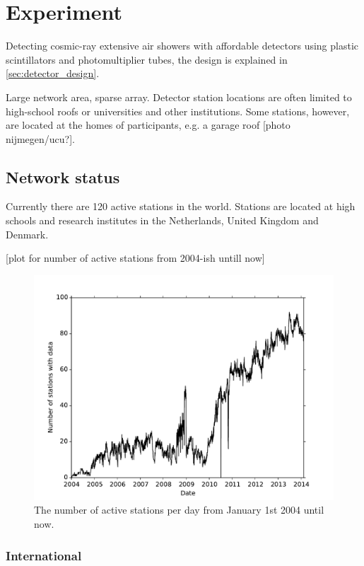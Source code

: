 \chapter{\hisparc Experiment}
\label{ch:hisparc-experiment}

Detecting cosmic-ray extensive air showers with affordable detectors
using plastic scintillators and photomultiplier tubes, the design is
explained in \cref{sec:detector_design}.

Large network area, sparse array. Detector station locations are often
limited to high-school roofs or universities and other institutions.
Some stations, however, are located at the homes of participants, e.g.
a garage roof [photo nijmegen/ucu?].


\section{Network status}

Currently there are 120 active \hisparc stations in the world. Stations
are located at high schools and research institutes in the Netherlands,
United Kingdom and Denmark.

[plot for number of active stations from 2004-ish untill now]

\begin{figure}
    \centering
    \includegraphics[width=0.7\linewidth]
        {plots/network/number_of_stations_with_data_per_day}
    \caption{ The number of active
             stations per day from January 1st 2004 until now.}
    \label{fig:number_of_stations_with_data_per_day}
\end{figure}


\subsection{International}

